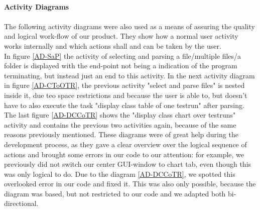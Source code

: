 \ \\
\textbf{Activity Diagrams}\\
\ \\
The following activity diagrams were also used as a means of assuring the quality and logical work-flow of our product. They show how a normal user activity works internally and which actions shall and can be taken by the user.\\ 
In figure \ref{AD-SaP} the activity of selecting and parsing a file/multiple files/a folder is displayed with the end-point not being a indication of the program terminating, but instead just an end to this activity. In the next activity diagram in figure \ref{AD-CToOTR}, the previous activity "select and parse files" is nested inside it, due teo space restrictions and because the user is able to, but doesn't have to also execute the task "display class table of one testrun" after parsing. The last figure \ref{AD-DCCoTR} shows the "display class chart over testruns" activity and contains the previous two activities again, because of the same reasons previously mentioned. These diagrams were of great help during the development process, as they gave a clear overview over the logical sequence of actions and brought some errors in our code to our attention: for example, we previously did not switch our center GUI-window to chart tab, even though this was only logical to do. Due to the diagram \ref{AD-DCCoTR}, we spotted this overlooked error in our code and fixed it. This was also only possible, because the diagram was based, but not restricted to our code and we adapted both bi-directional.\\
\ \\
